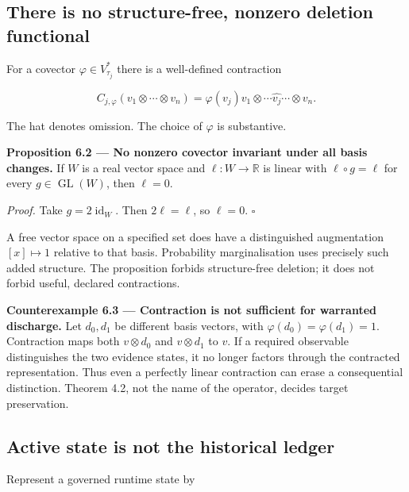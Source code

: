 \documentclass[11pt,a4paper]{article}
\begin{document}
\subsection{There is no structure-free, nonzero deletion
functional}\label{there-is-no-structure-free-nonzero-deletion-functional}

For a covector \(\varphi\in V_{\tau_j}^*\) there is a well-defined
contraction

\nopagebreak[4]

\[
C_{j,\varphi}(v_1\otimes\cdots\otimes v_n)
=\varphi(v_j)
 v_1\otimes\cdots\widehat{v_j}\cdots\otimes v_n.
\]

The hat denotes omission. The choice of \(\varphi\) is substantive.


\textbf{Proposition 6.2 --- No nonzero covector invariant under all
basis changes.} If \(W\) is a real vector space and
\(\ell:W\to\mathbb R\) is linear with \(\ell\circ g=\ell\) for every
\(g\in\operatorname{GL}(W)\), then \(\ell=0\).

\emph{Proof.} Take \(g=2\operatorname{id}_W\). Then \(2\ell=\ell\), so
\(\ell=0\). \(\square\)

A free vector space on a specified set does have a distinguished
augmentation \([x]\mapsto1\) relative to that basis. Probability
marginalisation uses precisely such added structure. The proposition
forbids structure-free deletion; it does not forbid useful, declared
contractions.


\textbf{Counterexample 6.3 --- Contraction is not sufficient for
warranted discharge.} Let \(d_0,d_1\) be different basis vectors, with
\(\varphi(d_0)=\varphi(d_1)=1\). Contraction maps both \(v\otimes d_0\)
and \(v\otimes d_1\) to \(v\). If a required observable distinguishes
the two evidence states, it no longer factors through the contracted
representation. Thus even a perfectly linear contraction can erase a
consequential distinction. Theorem 4.2, not the name of the operator,
decides target preservation.

\subsection{Active state is not the historical
ledger}\label{active-state-is-not-the-historical-ledger}

Represent a governed runtime state by

\nopagebreak[4]
\end{document}
